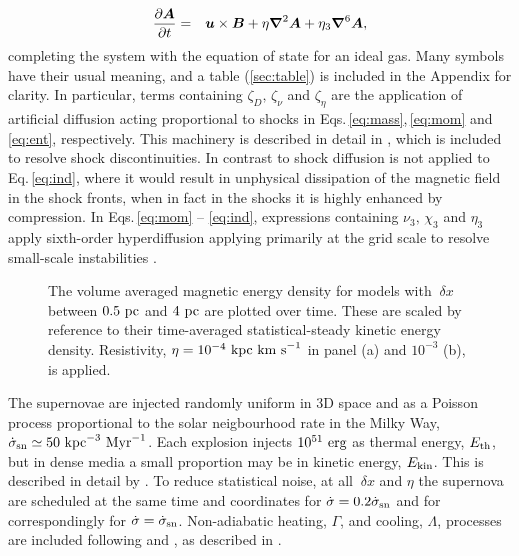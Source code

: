 \documentclass[preprint2]{aastex63}
\newcommand\SNr{\dot\sigma_{\rm sn}}
\newcommand\ESK{E_{\rm kin}}
\newcommand\EST{E_{\rm th}}
\newcommand{\vect}[1]{{{\mbox{\boldmath $#1$}}}}%
\newcommand\kpc{~ {\rm kpc}}
\newcommand\pc{~ {\rm pc}}
\newcommand\dx{~ {\delta x}}
\newcommand\Myr{~ {\rm Myr}}
\newcommand\erg{~ {\rm erg}}
\newcommand\kms{~ {\rm km~ s}^{-1}}
\begin{document}
  \begin{eqnarray}
  \label{eq:ind}
    \frac{\partial \vect{A}}{\partial t} &=&
    \vect{u}\times\vect{B}
    +\eta\vect\nabla^2\vect{A}
    +\eta_3\vect\nabla^6\vect{A},
  \end{eqnarray}
completing the system with the equation of state for an ideal gas.
Many symbols have their usual meaning, and a table (\ref{sec:table}) is
included in the Appendix for clarity.
In particular, terms containing $\zeta_D,\,\zeta_\nu$ and $\zeta_\eta$ are the
application of artificial diffusion acting proportional to shocks in 
Eqs.\,\eqref{eq:mass},\,\eqref{eq:mom} and \eqref{eq:ent}, respectively.
This machinery is described in detail in \citet{GMKSH20}, which is included to
resolve shock discontinuities.
In contrast to \citet{Gent:2013b} shock diffusion is not applied to
Eq.\,\eqref{eq:ind}, where it would result in unphysical dissipation of the
magnetic field in the shock fronts, when in fact in the shocks it is highly
enhanced by compression.
In Eqs.\,\eqref{eq:mom} -- \eqref{eq:ind}, expressions containing 
$\nu_3,\,\chi_3$ and $\eta_3$ apply sixth-order hyperdiffusion applying
primarily at the grid scale to resolve small-scale instabilities
\citep[see, e.g.,][]{ABGS02,HB04}.

\begin{figure*}
\caption{
The volume averaged magnetic energy density for models with $\dx$ between
$0.5\pc$ and $4\pc$ are plotted over time.
These are scaled by reference to their time-averaged statistical-steady kinetic
energy density.
Resistivity, $\eta=10^{-4}\kpc\kms$ in panel {\rm(a)} and $10^{-3}$ {\rm(b)}, is
applied.
\label{fig:eb-res}}
\end{figure*}

The supernovae are injected randomly uniform in 3D space and as a Poisson
process proportional to the solar neigbourhood rate in the Milky Way,
 $\SNr\simeq 50\kpc^{-3}\Myr^{-1}$.
Each explosion injects $10^{51}\erg$ as thermal energy, $\EST$, but in dense
media a small proportion may be in kinetic energy, $\ESK$.
This is described in detail by \citet{GMKSH20}.
To reduce statistical noise, at all $\dx$ and $\eta$ the supernova are
scheduled at the same time and coordinates for $\dot\sigma=0.2\SNr$ and for 
correspondingly for $\dot\sigma=\SNr$.
Non-adiabatic heating, $\Gamma$, and cooling, $\Lambda$, processes are included
following \citet{Wolfire:1995} and \citet{Sarazin:1987}, as described in 
\citet{Gent:2013a}.
\end{document}
